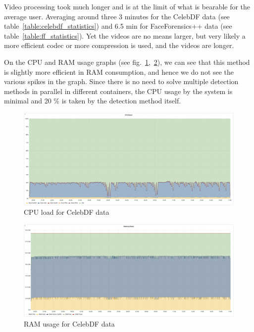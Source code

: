 Video processing took much longer and is at the limit of what is bearable for the average user. Averaging around three 3 minutes for the CelebDF data (see table~\ref{table:celebdf_statistics}) and 6.5 min for FaceForensics++ data (see table~\ref{table:ff_statistics}). Yet the videos are no means larger, but very likely a more efficient codec or more compression is used, and the videos are longer.

On the CPU and RAM usage graphs (see fig.~\ref{fig:celebdf_cpu},~\ref{fig:celebdf_ram}), we can see that this method is slightly more efficient in RAM consumption, and hence we do not see the various spikes in the graph. Since there is no need to solve multiple detection methods in parallel in different containers, the CPU usage by the system is minimal and 20 \% is taken by the detection method itself.

\begin{figure}[H]
    \centering
    \includegraphics[width=1\linewidth]{other-fig/tests/cdf_cpu.png}
    \caption{CPU load for CelebDF data}
    \label{fig:celebdf_cpu}
\end{figure}

\begin{figure}[H]
    \centering
    \includegraphics[width=1\linewidth]{other-fig/tests/cdf_ram.png}
    \caption{RAM usage for CelebDF data}
    \label{fig:celebdf_ram}
\end{figure}


